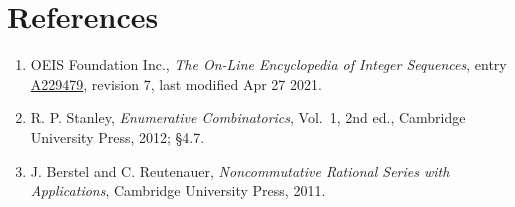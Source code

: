 \documentclass[11pt]{article}
\theoremstyle{definition}
\begin{document}
\section{References}

\begin{enumerate}

\item OEIS Foundation Inc., \emph{The On-Line Encyclopedia of Integer Sequences}, entry \href{https://oeis.org/A229479}{A229479}, revision 7, last modified Apr 27 2021.

\item R. P. Stanley, \emph{Enumerative Combinatorics}, Vol.~1, 2nd ed., Cambridge University Press, 2012; \S4.7.

\item J. Berstel and C. Reutenauer, \emph{Noncommutative Rational Series with Applications}, Cambridge University Press, 2011.

\end{enumerate}
\end{document}
